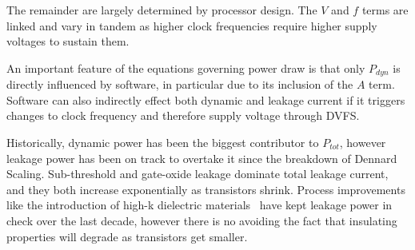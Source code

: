  The remainder are largely determined by processor design. The $V$ and $f$ terms are linked and vary in tandem as higher clock frequencies require higher supply voltages to sustain them. 


An important feature of the equations governing power draw is that only $P_{dyn}$ is directly influenced by software, in particular due to its inclusion of the $A$ term. Software can also indirectly effect both dynamic and leakage current if it triggers changes to clock frequency and therefore supply voltage through DVFS.  

Historically, dynamic power has been the biggest contributor to $P_{tot}$, however leakage power has been on track to overtake it since the breakdown of Dennard Scaling.  Sub-threshold and gate-oxide leakage dominate total leakage current, and they both increase exponentially as transistors shrink. Process improvements like the introduction of high-k dielectric materials~\cite{jan:2009aa} have kept leakage power in check over the last decade, however there is no avoiding the fact that insulating properties will degrade as transistors get smaller.
